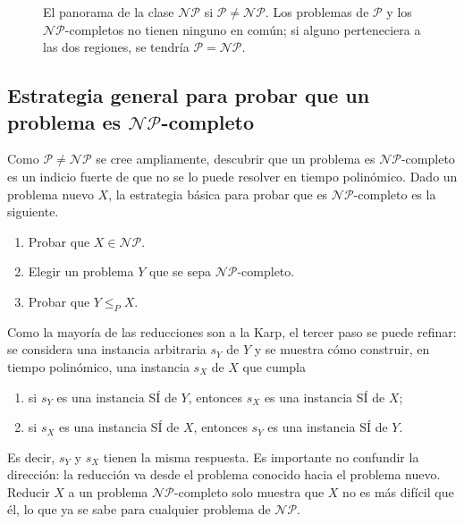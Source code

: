 \documentclass[12pt, spanish, oneside, openany]{book}
\newcommand{\clP}{\mathcal{P}}
\newcommand{\NP}{\mathcal{NP}}
\newcommand{\redp}{\le_{P}}
\newcommand{\prob}[1]{\textit{#1}}
\theoremstyle{uprightplain}
\theoremstyle{definition}
\theoremstyle{remark}
\theoremstyle{definition}
\begin{document}
\begin{figure}[H]
\centering
{}
\caption{El panorama de la clase $\NP$ si $\clP\neq\NP$. Los problemas de $\clP$ y
los $\NP$-completos no tienen ninguno en común; si alguno perteneciera a las dos
regiones, se tendría $\clP=\NP$.}
\label{fig:np-clases}
\end{figure}

\subsection{\texorpdfstring{Estrategia general para probar que un problema es $\NP$-completo}{Estrategia general para probar que un problema es NP-completo}}
\label{subsec:np-estrategia}

Como $\clP\neq\NP$ se cree ampliamente, descubrir que un problema es $\NP$-completo es un indicio fuerte de que no se lo puede resolver en tiempo polinómico. Dado un problema nuevo $X$, la estrategia básica para probar que es $\NP$-completo es la siguiente.
\begin{enumerate}
    \item Probar que $X\in\NP$.
    \item Elegir un problema $Y$ que se sepa $\NP$-completo.
    \item Probar que $Y\redp X$.
\end{enumerate}
Como la mayoría de las reducciones son a la Karp, el tercer paso se puede refinar: se considera una instancia arbitraria $s_Y$ de $Y$ y se muestra cómo construir, en tiempo polinómico, una instancia $s_X$ de $X$ que cumpla
\begin{enumerate}[label=(\alph*)]
    \item si $s_Y$ es una instancia SÍ de $Y$, entonces $s_X$ es una instancia SÍ de $X$;
    \item si $s_X$ es una instancia SÍ de $X$, entonces $s_Y$ es una instancia SÍ de $Y$.
\end{enumerate}
Es decir, $s_Y$ y $s_X$ tienen la misma respuesta. Es importante no confundir la dirección: la reducción va desde el problema conocido hacia el problema nuevo. Reducir $X$ a un problema $\NP$-completo solo muestra que $X$ no es más difícil que él, lo que ya se sabe para cualquier problema de $\NP$.
\end{document}
